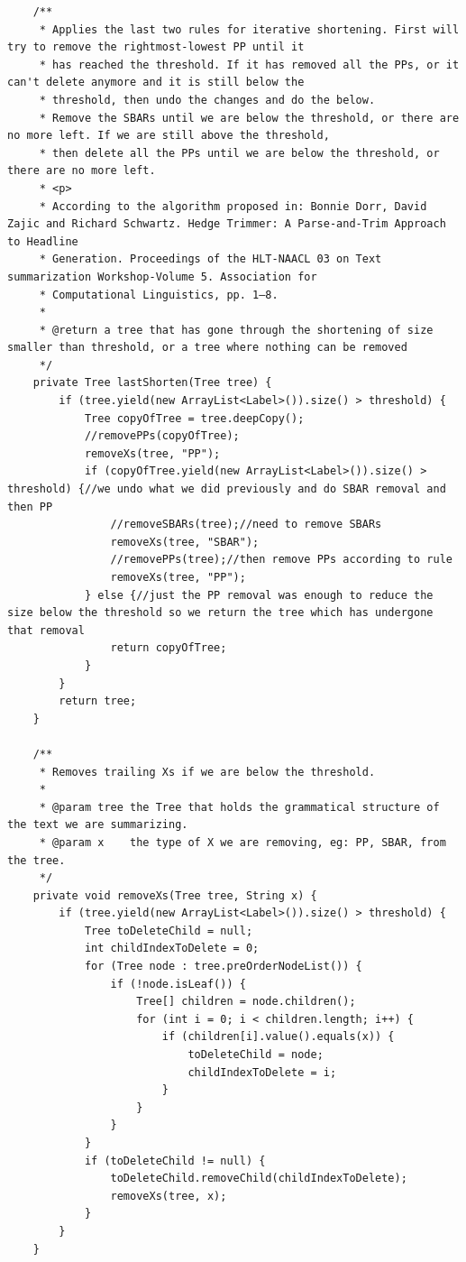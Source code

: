 \begin{lstlisting}
    /**
     * Applies the last two rules for iterative shortening. First will try to remove the rightmost-lowest PP until it
     * has reached the threshold. If it has removed all the PPs, or it can't delete anymore and it is still below the
     * threshold, then undo the changes and do the below.
     * Remove the SBARs until we are below the threshold, or there are no more left. If we are still above the threshold,
     * then delete all the PPs until we are below the threshold, or there are no more left.
     * <p>
     * According to the algorithm proposed in: Bonnie Dorr, David Zajic and Richard Schwartz. Hedge Trimmer: A Parse-and-Trim Approach to Headline
     * Generation. Proceedings of the HLT-NAACL 03 on Text summarization Workshop-Volume 5. Association for
     * Computational Linguistics, pp. 1–8.
     *
     * @return a tree that has gone through the shortening of size smaller than threshold, or a tree where nothing can be removed
     */
    private Tree lastShorten(Tree tree) {
        if (tree.yield(new ArrayList<Label>()).size() > threshold) {
            Tree copyOfTree = tree.deepCopy();
            //removePPs(copyOfTree);
            removeXs(tree, "PP");
            if (copyOfTree.yield(new ArrayList<Label>()).size() > threshold) {//we undo what we did previously and do SBAR removal and then PP
                //removeSBARs(tree);//need to remove SBARs
                removeXs(tree, "SBAR");
                //removePPs(tree);//then remove PPs according to rule
                removeXs(tree, "PP");
            } else {//just the PP removal was enough to reduce the size below the threshold so we return the tree which has undergone that removal
                return copyOfTree;
            }
        }
        return tree;
    }

    /**
     * Removes trailing Xs if we are below the threshold.
     *
     * @param tree the Tree that holds the grammatical structure of the text we are summarizing.
     * @param x    the type of X we are removing, eg: PP, SBAR, from the tree.
     */
    private void removeXs(Tree tree, String x) {
        if (tree.yield(new ArrayList<Label>()).size() > threshold) {
            Tree toDeleteChild = null;
            int childIndexToDelete = 0;
            for (Tree node : tree.preOrderNodeList()) {
                if (!node.isLeaf()) {
                    Tree[] children = node.children();
                    for (int i = 0; i < children.length; i++) {
                        if (children[i].value().equals(x)) {
                            toDeleteChild = node;
                            childIndexToDelete = i;
                        }
                    }
                }
            }
            if (toDeleteChild != null) {
                toDeleteChild.removeChild(childIndexToDelete);
                removeXs(tree, x);
            }
        }
    }


\end{lstlisting}
